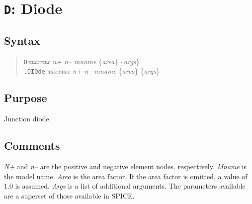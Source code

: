 %
%
%
%
\section{{\tt D}: Diode}
\subsection{Syntax}
\begin{verse}
  {\tt D}{\it xxxxxxx n+ n-- mname} \{{\it area}\} \{{\it args}\}\\
  {\tt .DIOde} {\it xxxxxxx n+ n-- mname} \{{\it area}\} 
        \{{\it args}\}
\end{verse}
\subsection{Purpose}

Junction diode.
\subsection{Comments}

{\it N+} and {\it n--} are the positive and negative element nodes,
respectively.  {\it Mname} is the model name.  {\it Area} is the area
factor.  If the area factor is omitted, a value of 1.0 is assumed.
{\it Args} is a list of additional arguments.  The parameters
available are a superset of those available in SPICE.


